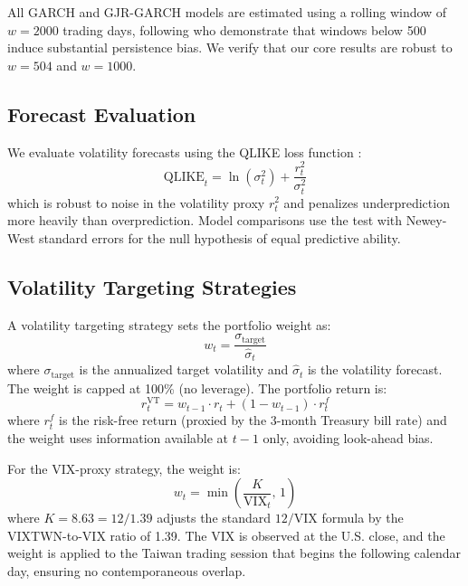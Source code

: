 All GARCH and GJR-GARCH models are estimated using a rolling window of $w = 2000$ trading days, following \citet{hwang2006} who demonstrate that windows below 500 induce substantial persistence bias. We verify that our core results are robust to $w = 504$ and $w = 1000$.

\subsection{Forecast Evaluation}

We evaluate volatility forecasts using the QLIKE loss function \citep{patton2011}:
\begin{equation}
\text{QLIKE}_t = \ln(\sigma_t^2) + \frac{r_t^2}{\sigma_t^2}
\label{eq:qlike}
\end{equation}
which is robust to noise in the volatility proxy $r_t^2$ and penalizes underprediction more heavily than overprediction. Model comparisons use the \citet{diebold1995} test with Newey-West standard errors for the null hypothesis of equal predictive ability.

\subsection{Volatility Targeting Strategies}

A volatility targeting strategy sets the portfolio weight as:
\begin{equation}
w_t = \frac{\sigma_{\text{target}}}{\hat{\sigma}_t}
\label{eq:vt}
\end{equation}
where $\sigma_{\text{target}}$ is the annualized target volatility and $\hat{\sigma}_t$ is the volatility forecast. The weight is capped at 100\% (no leverage). The portfolio return is:
\begin{equation}
r_t^{\text{VT}} = w_{t-1} \cdot r_t + (1 - w_{t-1}) \cdot r_t^{f}
\label{eq:vt_return}
\end{equation}
where $r_t^{f}$ is the risk-free return (proxied by the 3-month Treasury bill rate) and the weight uses information available at $t-1$ only, avoiding look-ahead bias.

For the VIX-proxy strategy, the weight is:
\begin{equation}
w_t = \min\!\left(\frac{K}{\text{VIX}_t}, \, 1\right)
\label{eq:vix_vt}
\end{equation}
where $K = 8.63 = 12 / 1.39$ adjusts the standard $12/\text{VIX}$ formula \citep{bozovic2024} by the VIXTWN-to-VIX ratio of 1.39. The VIX is observed at the U.S. close, and the weight is applied to the Taiwan trading session that begins the following calendar day, ensuring no contemporaneous overlap.

